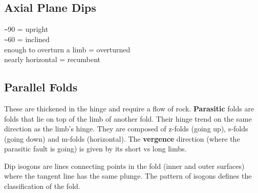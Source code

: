 \documentclass[12pt,a4paper]{report}
\begin{document}
\subsection*{Axial Plane Dips}
\verb|~|90 = upright\\
\verb|~|60 = inclined\\
enough to overturn a limb = overturned\\
nearly horizontal = recumbent

\subsection*{Parallel Folds}
These are thickened in the hinge and require a flow of rock.
\textbf{Parasitic} folds are folds that lie on top of the limb of another fold.
Their hinge trend on the same direction as the limb's hinge.
They are composed of z-folds (going up), s-folds (going down) and m-folds (horizontal).
The \textbf{vergence} direction (where the parasitic fault is going) is given by its short vs long limbs.

Dip isogons are lines connecting points in the fold (inner and outer surfaces) where the tangent line has the same plunge.
The pattern of isogons defines the classification of the fold.\\
\\
\end{document}
